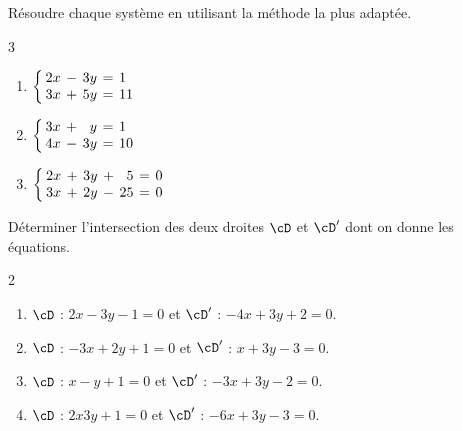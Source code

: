 Résoudre chaque système en utilisant la méthode la plus adaptée.
\vspace{-6pt}
\setlength{\columnsep}{1cm}
\setlength{\columnseprule}{0pt}
\begin{multicols}{3}
\begin{enumerate}
\item $\left\{\setlength\arraycolsep{2pt}\begin{array}{rcrcl}
2x & - & 3y & = & 1 \\
3x & + & 5y & = & 11
\end{array}\right.$
\item $\left\{\setlength\arraycolsep{2pt}\begin{array}{rcrcl}
3x & + & y & = & 1 \\
4x & - & 3y & = & 10
\end{array}\right.$
\item $\left\{\setlength\arraycolsep{2pt}\begin{array}{rcrcrcl}
2x & + & 3y & + & 5 & = & 0 \\
3x & + & 2y & - & 25 & = & 0
\end{array}\right.$
\end{enumerate}
\end{multicols}
\vspace{-6pt}

\exo

Déterminer l'intersection des deux droites $\cD$ et $\cD'$ dont on donne les équations.
\vspace{-6pt}
\setlength{\columnsep}{1cm}
\setlength{\columnseprule}{0pt}
\begin{multicols}{2}
\begin{enumerate}
\item $\cD$ : $2x-3y-1=0$ et $\cD'$ : $-4x+3y+2=0$.
\medskip
\item $\cD$ : $-3x+2y+1=0$ et $\cD'$ : $x+3y-3=0$.
\item $\cD$ : $x-y+1=0$ et $\cD'$ : $-3x+3y-2=0$.
\medskip
\item $\cD$ : $2x3y+1=0$ et $\cD'$ : $-6x+3y-3=0$.
\end{enumerate}
\end{multicols}
\vspace{-8pt}

\exo


